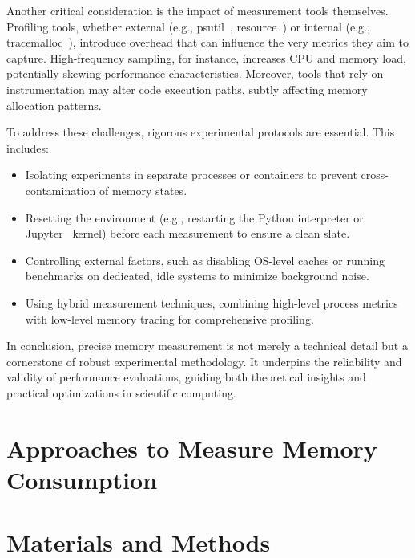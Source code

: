 Another critical consideration is the impact of measurement tools themselves.
Profiling tools, whether external (e.g., psutil~\cite{psutil}, resource~\cite{importlib_resources}) or internal (e.g., tracemalloc~\cite{tracemalloc}), introduce overhead that can influence the very metrics they aim to capture.
High-frequency sampling, for instance, increases \ac{CPU} and memory load, potentially skewing performance characteristics.
Moreover, tools that rely on instrumentation may alter code execution paths, subtly affecting memory allocation patterns.

To address these challenges, rigorous experimental protocols are essential.
This includes:

\begin{itemize}
    \item Isolating experiments in separate processes or containers to prevent cross-contamination of memory states.
    \item Resetting the environment (e.g., restarting the Python interpreter or Jupyter~\cite{jupyter} kernel) before each measurement to ensure a clean slate.
    \item Controlling external factors, such as disabling OS-level caches or running benchmarks on dedicated, idle systems to minimize background noise.
    \item Using hybrid measurement techniques, combining high-level process metrics with low-level memory tracing for comprehensive profiling.
\end{itemize}

In conclusion, precise memory measurement is not merely a technical detail but a cornerstone of robust experimental methodology.
It underpins the reliability and validity of performance evaluations, guiding both theoretical insights and practical optimizations in scientific computing.


\section{Approaches to Measure Memory Consumption}
\label{sec:mmc-approaches}



\section{Materials and Methods}
\label{sec:mmc-materials-methods}

